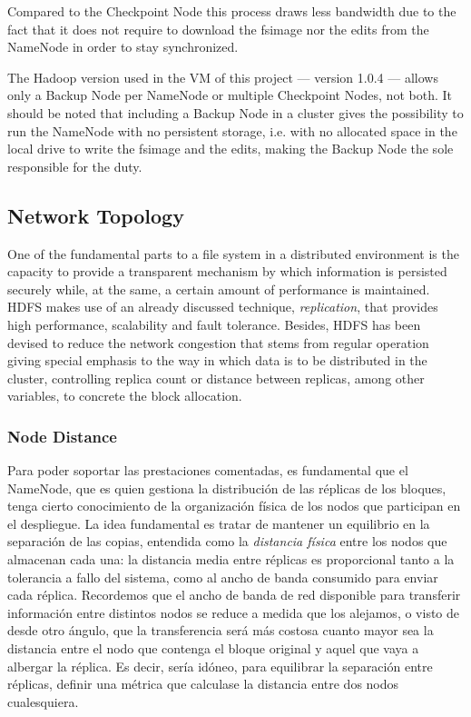 Compared to the Checkpoint Node this process draws less bandwidth due to the fact that it does not require to download the fsimage nor the edits from the NameNode in order to stay synchronized.

The Hadoop version used in the VM of this project --- version 1.0.4 --- allows only a Backup Node per NameNode or multiple Checkpoint Nodes, not both. It should be noted that including a Backup Node in a cluster gives the possibility to run the NameNode with no persistent storage, i.e. with no allocated space in the local drive to write the fsimage and the edits, making the Backup Node the sole responsible for the duty.

\subsection{Network Topology}\label{subsec:topologiared}
\noindent One of the fundamental parts to a file system in a distributed environment is the capacity to provide a transparent mechanism by which information is persisted securely while, at the same, a certain amount of performance is maintained. HDFS makes use of an already discussed technique, \emph{replication}, that provides high performance, scalability and fault tolerance. Besides, HDFS has been devised to reduce the network congestion that stems from regular operation giving special emphasis to the way in which data is to be distributed in the cluster, controlling replica count or distance between replicas, among other variables, to concrete the block allocation.

\subsubsection{Node Distance}\label{subsubsec:distnodos}
\noindent Para poder soportar las prestaciones comentadas, es fundamental que el NameNode, que es quien gestiona la distribuci\'on de las r\'eplicas de los bloques, tenga cierto conocimiento de la organizaci\'on f\'isica de los nodos que participan en el despliegue. La idea fundamental es tratar de mantener un equilibrio en la separaci\'on de las copias, entendida como la \emph{distancia f\'isica} entre los nodos que almacenan cada una: la distancia media entre r\'eplicas es proporcional tanto a la tolerancia a fallo del sistema, como al ancho de banda consumido para enviar cada r\'eplica. Recordemos que el ancho de banda de red disponible para transferir informaci\'on entre distintos nodos se reduce a medida que los alejamos, o visto de desde otro \'angulo, que la transferencia ser\'a m\'as costosa cuanto mayor sea la distancia entre el nodo que contenga el bloque original y aquel que vaya a albergar la r\'eplica. Es decir, ser\'ia id\'oneo, para equilibrar la separaci\'on entre r\'eplicas, definir una m\'etrica que calculase la distancia entre dos nodos cualesquiera.\newline

